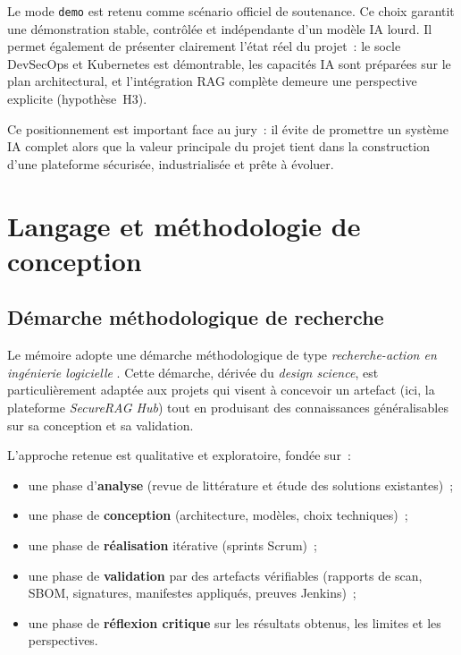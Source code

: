 Le mode \texttt{demo} est retenu comme scénario officiel de soutenance. Ce choix garantit une démonstration stable, contrôlée et indépendante d'un modèle IA lourd. Il permet également de présenter clairement l'état réel du projet~: le socle DevSecOps et Kubernetes est démontrable, les capacités IA sont préparées sur le plan architectural, et l'intégration RAG complète demeure une perspective explicite (hypothèse~H3).

Ce positionnement est important face au jury~: il évite de promettre un système IA complet alors que la valeur principale du projet tient dans la construction d'une plateforme sécurisée, industrialisée et prête à évoluer.

\section{Langage et méthodologie de conception}
\label{sec:methodologie}

\subsection{Démarche méthodologique de recherche}

Le mémoire adopte une démarche méthodologique de type \textit{recherche-action en ingénierie logicielle} \cite{wieringa_design_science_2014}. Cette démarche, dérivée du \textit{design science}, est particulièrement adaptée aux projets qui visent à concevoir un artefact (ici, la plateforme \textit{SecureRAG Hub}) tout en produisant des connaissances généralisables sur sa conception et sa validation.

L'approche retenue est qualitative et exploratoire, fondée sur~:
\begin{itemize}
    \item une phase d'\textbf{analyse} (revue de littérature et étude des solutions existantes)~;
    \item une phase de \textbf{conception} (architecture, modèles, choix techniques)~;
    \item une phase de \textbf{réalisation} itérative (sprints Scrum)~;
    \item une phase de \textbf{validation} par des artefacts vérifiables (rapports de scan, SBOM, signatures, manifestes appliqués, preuves Jenkins)~;
    \item une phase de \textbf{réflexion critique} sur les résultats obtenus, les limites et les perspectives.
\end{itemize}

